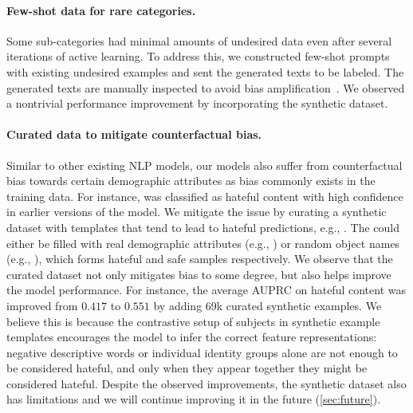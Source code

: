 \documentclass[letterpaper]{article} %
\begin{document}
\paragraph{Few-shot data for rare categories.} 

Some sub-categories had minimal amounts of undesired data even after several iterations of active learning. To address this, we constructed few-shot prompts with existing undesired examples and sent the generated texts to be labeled. The generated texts are manually inspected to avoid bias amplification~\citep{zhao-etal-2017-men}. We observed a nontrivial performance improvement by incorporating the synthetic dataset.


\paragraph{Curated data to mitigate counterfactual bias.} Similar to other existing NLP models, our models also suffer from counterfactual bias towards certain demographic attributes as bias commonly exists in the training data. For instance,  was classified as hateful content with high confidence in earlier versions of the model. We mitigate the issue by curating a synthetic dataset with templates that tend to lead to hateful predictions, e.g., . The \w{[subject]} could either be filled with real demographic attributes (e.g., ) or random object names (e.g., ), which forms hateful and safe samples respectively. We observe that the curated dataset not only mitigates bias to some degree, but also helps improve the model performance. For instance, the average AUPRC on hateful content was improved from $0.417$ to $0.551$ by adding 69k curated synthetic examples. We believe this is because the contrastive setup of subjects in synthetic example templates encourages the model to infer the correct feature representations: negative descriptive words or individual identity groups alone are not enough to be considered hateful, and only when they appear together they might be considered hateful. Despite the observed improvements, the synthetic dataset also has limitations and we will continue improving it in the future (\cref{sec:future}).
\end{document}
